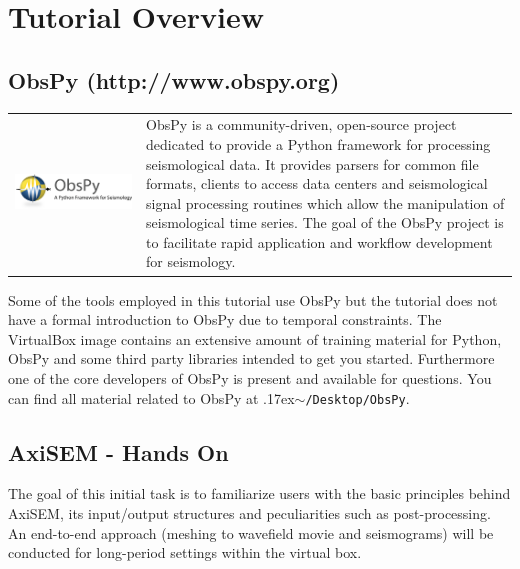 \documentclass{article}
\newcommand{\ttilde}[0]{\raise.17ex\hbox{$\scriptstyle\sim$}}
\begin{document}
%
\section{Tutorial Overview}
%
\subsection*{ObsPy \small{(http://www.obspy.org)}}
\vspace{1ex}
\begin{center}
    \begin{tabularx}{\textwidth}{lX}
        \begin{minipage}{0.3\textwidth}
            \begin{center}
                \includegraphics[width=0.9\columnwidth]{obspy.png}
            \end{center}
        \end{minipage}
        &
        \begin{minipage}{0.65\textwidth}
            ObsPy is a community-driven, open-source project dedicated to
            provide a Python framework for processing seismological data. It
            provides parsers for common file formats, clients to access data
            centers and seismological signal processing routines which allow
            the manipulation of seismological time series. The goal of the
            ObsPy project is to facilitate rapid application and workflow
            development for seismology.
        \end{minipage}
    \end{tabularx}
\end{center}


Some of the tools employed in this tutorial use ObsPy but the tutorial
does not have a formal introduction to ObsPy due to temporal
constraints. The VirtualBox image contains an extensive amount of
training material for Python, ObsPy and some third party libraries
intended to get you started. Furthermore one of the core developers of
ObsPy is present and available for questions. You can find all material related
to ObsPy at \ttilde\verb|/Desktop/ObsPy|.
%
\subsection*{AxiSEM - Hands On}
The goal of this initial task is to familiarize users with the basic
principles behind AxiSEM, its input/output structures and
peculiarities such as post-processing. An end-to-end approach (meshing to
wavefield movie and seismograms) will be conducted for long-period
settings within the virtual box.
%
\end{document}
